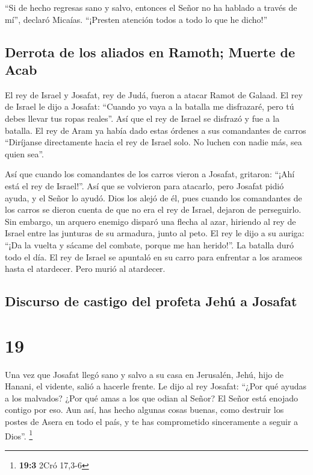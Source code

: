  ``Si de hecho regresas sano y salvo, entonces el Señor
no ha hablado a través de mí'', declaró Micaías. ``¡Presten atención
todos a todo lo que he dicho!''

\hypertarget{derrota-de-los-aliados-en-ramoth-muerte-de-acab}{%
\subsection{Derrota de los aliados en Ramoth; Muerte de
Acab}\label{derrota-de-los-aliados-en-ramoth-muerte-de-acab}}

 El rey de Israel y Josafat, rey de Judá, fueron a atacar
Ramot de Galaad.  El rey de Israel le dijo a Josafat:
``Cuando yo vaya a la batalla me disfrazaré, pero tú debes llevar tus
ropas reales''. Así que el rey de Israel se disfrazó y fue a la batalla.
 El rey de Aram ya había dado estas órdenes a sus
comandantes de carros ``Diríjanse directamente hacia el rey de Israel
solo. No luchen con nadie más, sea quien sea''.

 Así que cuando los comandantes de los carros vieron a
Josafat, gritaron: ``¡Ahí está el rey de Israel!''. Así que se volvieron
para atacarlo, pero Josafat pidió ayuda, y el Señor lo ayudó. Dios los
alejó de él,  pues cuando los comandantes de los carros
se dieron cuenta de que no era el rey de Israel, dejaron de perseguirlo.
 Sin embargo, un arquero enemigo disparó una flecha al
azar, hiriendo al rey de Israel entre las junturas de su armadura, junto
al peto. El rey le dijo a su auriga: ``¡Da la vuelta y sácame del
combate, porque me han herido!''.  La batalla duró todo
el día. El rey de Israel se apuntaló en su carro para enfrentar a los
arameos hasta el atardecer. Pero murió al atardecer.

\hypertarget{discurso-de-castigo-del-profeta-jehuxfa-a-josafat}{%
\subsection{Discurso de castigo del profeta Jehú a
Josafat}\label{discurso-de-castigo-del-profeta-jehuxfa-a-josafat}}

\hypertarget{section-18}{%
\section{19}\label{section-18}}

 Una vez que Josafat llegó sano y salvo a su casa en
Jerusalén,  Jehú, hijo de Hanani, el vidente, salió a
hacerle frente. Le dijo al rey Josafat: ``¿Por qué ayudas a los
malvados? ¿Por qué amas a los que odian al Señor? El Señor está enojado
contigo por eso.  Aun así, has hecho algunas cosas buenas,
como destruir los postes de Asera en todo el país, y te has comprometido
sinceramente a seguir a Dios''. \footnote{\textbf{19:3} 2Cró 17,3-6}

